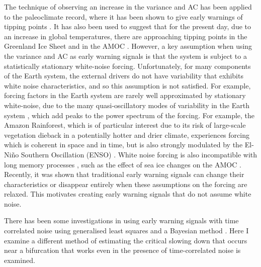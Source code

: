 The technique of observing an increase in the variance and
AC has been applied to the paleoclimate record, where it has been shown to give early
warnings of tipping points \parencite{Boers2018a}. It has also been used to 
suggest that for the present day, due to an increase in global temperatures, there are approaching tipping points in 
the Greenland Ice Sheet \parencite{Boers2021} and in the AMOC \parencite{Boers2021a}.	
However, a key assumption when using the variance and AC as early warning signals is that the system is subject to a statistically stationary white-noise forcing. Unfortunately, for many
components of the Earth system, the external drivers do not have variability that exhibits white noise characteristics, and
so this assumption is not satisfied. For example, forcing factors in the Earth system are rarely well approximated by stationary white-noise, due to the many quasi-oscillatory modes
of variability in the Earth system \parencite{VonderHeydt2021}, which add peaks
to the power spectrum of the forcing. For example, the Amazon
Rainforest, which is of particular interest due to its risk of large-scale vegetation dieback in a potentially hotter and drier
climate, experiences
forcing which is coherent in space and in time, but is also strongly modulated by the
El-Ni\~{n}o Southern Oscillation (ENSO) \parencite{Jimenez-Munoz2016}.
White noise forcing is also incompatible with
long memory processes \parencite{Hurst1957}, such as the effect of sea ice changes on the AMOC \parencite{Kuehn2021}. Recently, it was shown \parencite{Kuehn2021}
that traditional early warning signals  can change their characteristics or disappear entirely when these assumptions on the forcing are relaxed. This motivates creating early warning signals that do not assume white noise.


There has been some investigations in using early warning signals with time correlated noise using generalised least
squares \parencite{Boers2021a,Boettner2022} and a Bayesian method \parencite{hessler2022,Hessler2022b}. Here I examine a different method of
estimating the critical slowing down that occurs near a bifurcation that works even in the presence of time-correlated noise is examined.


